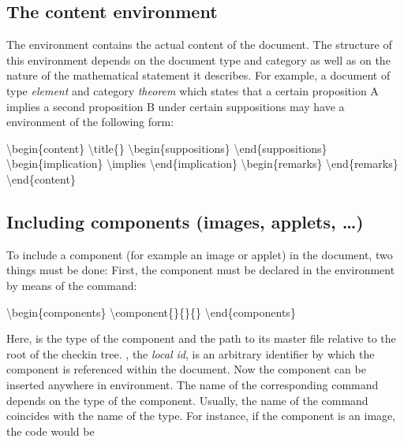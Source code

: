 \documentclass{generic}
\newcommand{\texcmd}[1]{\backslash#1}
\begin{document}
\subsection{The content environment}

The  environment contains the actual content of the document. The
structure of this environment depends on the document type and category as well
as on the nature of the mathematical statement it describes. For example, a
document of type \emph{element} and category \emph{theorem} which states that a
certain proposition A implies a second proposition B under certain suppositions
may have a  environment of the following form:

\begin{preformatted}%
\texcmd{begin}\{content\}
  \texcmd{title}\{\}
  \texcmd{begin}\{suppositions\}
  \texcmd{end}\{suppositions\}
  \texcmd{begin}\{implication\}
    \texcmd{implies}
  \texcmd{end}\{implication\}
  \texcmd{begin}\{remarks\}
  \texcmd{end}\{remarks\}
\texcmd{end}\{content\}
\end{preformatted}

\subsection{Including components (images, applets, \ldots)}

To include a component (for example an image or applet) in the document, two
things must be done: First, the component must be declared in the
 environment by means of the \code{\texcmd{component}} command:

\begin{preformatted}%
\texcmd{begin}\{components\}
  \texcmd{component}\{\}\{\}\{\}
\texcmd{end}\{components\}
\end{preformatted}

Here,  is the type of the component and  the path to
its master file relative to the root of the checkin tree. , the
\emph{local id}, is an arbitrary identifier by which the component is
referenced within the document. Now the component can be inserted
anywhere in  environment. The name of the corresponding command
depends on the type of the component. Usually, the name of the command
coincides with the name of the type. For instance, if the component is an
image, the code would be
\end{document}
